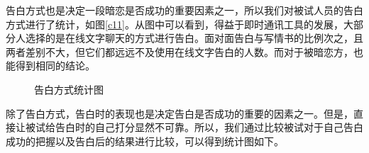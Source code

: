 \documentclass[10pt, a4paper, twocolumn]{ctexart}
\begin{document}
告白方式也是决定一段暗恋是否成功的重要因素之一，所以我们对被试人员的告白方式进行了统计，如图\ref{c11}。从图中可以看到，得益于即时通讯工具的发展，大部分人选择的是在线文字聊天的方式进行告白。面对面告白与写情书的比例次之，且两者差别不大，但它们都远远不及使用在线文字告白的人数。而对于被暗恋方，也能得到相同的结论。\\
\begin{figure}[htbp]
	\quad
	\caption{告白方式统计图} %
\end{figure}
\indent 除了告白方式，告白时的表现也是决定告白是否成功的重要的因素之一。但是，直接让被试给告白时的自己打分显然不可靠。所以，我们通过比较被试对于自己告白成功的把握以及告白后的结果进行比较，可以得到统计图如下。\\
\end{document}
